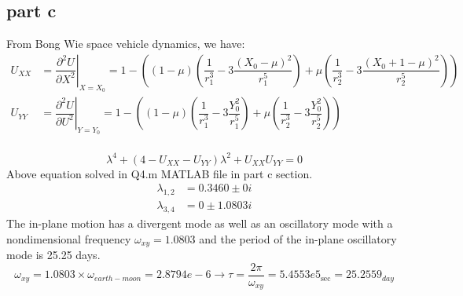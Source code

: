 \subsection{part c}
From Bong Wie space vehicle dynamics, we have:
\begin{equation*}
    \begin{split}
        U_{XX} &= \left.\dfrac{\partial^2 U}{\partial X^2}\right|_{ X = X_0} = 1 - \left((1-\mu)\left(\dfrac{1}{r_1^3}-3\dfrac{(X_0 - \mu)^2}{r_1^5}\right)+\mu \left(\dfrac{1}{r_2^3}-3\dfrac{(X_0+1-\mu)^2}{r_2^5}\right)\right)\\
        U_{YY} &= \left.\dfrac{\partial^2 U}{\partial U^2}\right|_{ Y = Y_0} = 1 - \left((1-\mu)\left(\dfrac{1}{r_1^3}-3\dfrac{Y_0^2}{r_1^5}\right)+\mu \left(\dfrac{1}{r_2^3}-3\dfrac{Y_0^2}{r_2^5}\right)\right)\\
    \end{split}
\end{equation*}

$$
\lambda^4 + (4-U_{XX}-U_{YY})\lambda^2 + U_{XX}U_{YY} = 0
$$
Above equation solved in Q4.m MATLAB file in part c section.
\begin{equation*}
    \begin{split}
        \lambda_{1, 2} &= 0.3460 \pm 0i\\
        \lambda_{3, 4} &= 0 \pm 1.0803i
    \end{split}
\end{equation*}
The in-plane motion has a divergent mode as well as an oscillatory mode with a nondimensional frequency $\omega_{xy} =  1.0803$ and the period of the in-plane oscillatory mode is 25.25 days.
$$
\omega_{xy} =  1.0803\times\omega_{earth-moon}  = 2.8794e-6 \rightarrow \tau = \dfrac{2\pi}{\omega_{xy}} = 5.4553e5_{\sec} = 25.2559_{day}
$$

